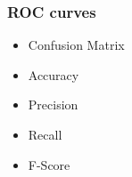 \documentclass[PredictiveAnalytics101.tex]{subfiles}
\begin{document}
 

\begin{frame}
	\frametitle{ROC curves}
	
	\begin{itemize}
		\item Confusion Matrix
		\item Accuracy 
	\item Precision	
		\item Recall
		\item F-Score
	\end{itemize}
\end{frame}
	
	
\end{document}
